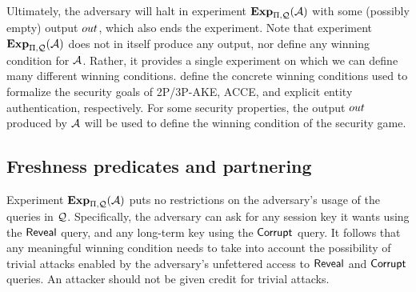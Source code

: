 \bigskip

Ultimately,
the adversary will halt in experiment $\mathbf{Exp}_{\mathrm{\Pi},\mathcal{Q}}^{}(\mathcal{A})$ with some (possibly empty) output $out$,
which also ends the experiment.
Note that experiment $\mathbf{Exp}_{\mathrm{\Pi},\mathcal{Q}}^{}(\mathcal{A})$ does not in itself produce any output,
nor define any winning condition for $\mathcal{A}$.
Rather, it provides a single experiment on which we can define many different winning conditions.
 define the concrete winning conditions used to formalize the security goals of 2P/3P-AKE, ACCE,
and explicit entity authentication,
respectively.
For some security properties,
the output $out$ produced by $\mathcal{A}$ will be used to define the winning condition of the security game.







\subsection{Freshness predicates and partnering}\label{sec:definitions:partnering}

Experiment $\mathbf{Exp}_{\mathrm{\Pi},\mathcal{Q}}^{}(\mathcal{A})$ puts no restrictions on the adversary's usage of the queries in $\mathcal{Q}$.
Specifically,
the adversary can ask for any session key it wants using the $\mathsf{Reveal}$ query, and any long-term key using the $\mathsf{Corrupt}$ query.
It follows that any meaningful winning condition needs to take into account the possibility of trivial attacks enabled by the adversary's unfettered access to $\mathsf{Reveal}$ and $\mathsf{Corrupt}$ queries. 
An attacker should not be given credit for trivial attacks.

